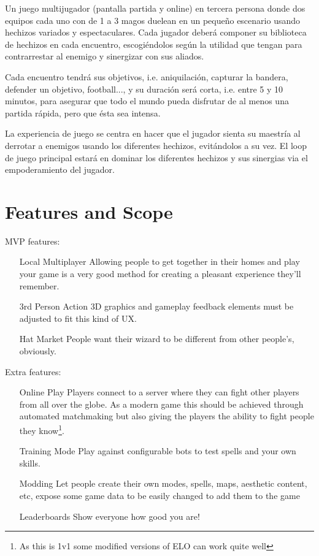\documentclass[12pt]{article}
\begin{document}
Un juego multijugador (pantalla partida y online) en tercera persona donde dos equipos cada uno con de 1 a 3 magos duelean en un pequeño escenario usando hechizos variados y espectaculares. Cada jugador deberá componer su biblioteca de hechizos en cada encuentro, escogiéndolos según la utilidad que tengan para contrarrestar al enemigo y sinergizar con sus aliados. 

Cada encuentro tendrá sus objetivos, i.e. aniquilación, capturar la bandera, defender un objetivo, football..., y su duración será corta, i.e. entre 5 y 10 minutos, para asegurar que todo el mundo pueda disfrutar de al menos una partida rápida, pero que ésta sea intensa.

La experiencia de juego se centra en hacer que el jugador sienta su maestría al derrotar a enemigos usando los diferentes hechizos, evitándolos a su vez. El loop de juego principal estará en dominar los diferentes hechizos y sus sinergias via el empoderamiento del jugador.

\newpage

\section{Features and Scope}

MVP features:

\begin{enumerate}
 	\item[Local Multiplayer] Allowing people to get together in their homes and play your game is a very good method for creating a pleasant experience they'll remember.
	\item[3rd Person Action] 3D graphics and gameplay feedback elements must be adjusted to fit this kind of UX.
	\item[Hat Market] People want their wizard to be different from other people's, obviously.
\end{enumerate}

Extra features:

\begin{enumerate}
	\item[Online Play] Players connect to a server where they can fight other players from all over the globe. As a modern game this should be achieved through automated matchmaking but also giving the players the ability to fight people they know\footnote{As this is 1v1 some modified versions of ELO can work quite well}.
	\item[Training Mode] Play against configurable bots to test spells and your own skills.
	\item[Modding] Let people create their own modes, spells, maps, aesthetic content, etc, expose some game data to be easily changed to add them to the game
	\item[Leaderboards] Show everyone how good you are!
\end{enumerate}
\end{document}
